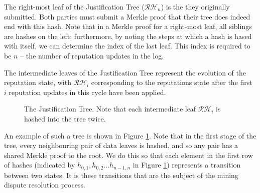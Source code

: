 The right-most leaf of the Justification Tree ($\mathcal{RH}_n$) is the  they originally submitted. Both parties must submit a Merkle proof that their tree does indeed end with this hash. Note that in a Merkle proof for a right-most leaf, all siblings are hashes on the left; furthermore, by noting the steps at which a hash is hased with itself, we can determine the index of the last leaf. This index is required to be $n$ -- the number of reputation updates in the log.

The intermediate leaves of the Justification Tree represent the evolution of the reputation state, with $\mathcal{RH}_i$ corresponding to the reputations state after the first $i$ reputation updates in this cycle have been applied. 

\begin{figure}
\centering
{}
\caption{The Justification Tree. Note that each intermediate leaf $\mathcal{RH}_i$ is hashed into the tree twice. }
\label{fig:justification-tree}
\end{figure}
An example of such a tree is shown in Figure \ref{fig:justification-tree}. Note that in the first stage of the tree, every neighbouring pair of data leaves is hashed, and so any pair has a shared Merkle proof to the root. We do this so that each element in the first row of hashes (indicated by $h_{0,1}, h_{0,2} \ldots h_{n-1,n}$ in Figure \ref{fig:justification-tree}) represents a transition between two states. It is these transitions that are the subject of the mining dispute resolution process.

